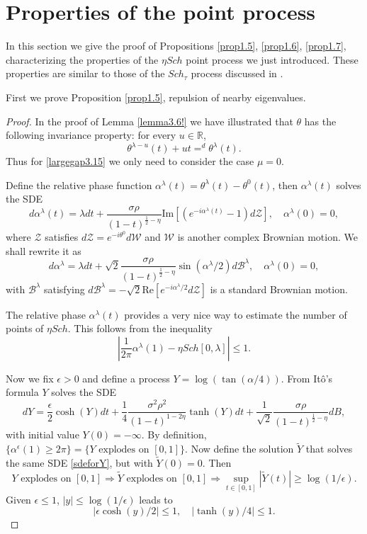 \documentclass[12pt, reqno]{amsart}
\theoremstyle{definition}
\theoremstyle{remark}
\numberwithin{equation}{section}
\begin{document}
\section{Properties of the point process}\label{section6}
In this section we give the proof of Propositions \ref{prop1.5}, \ref{prop1.6}, \ref{prop1.7}, characterizing the properties of the $\eta Sch$ point process we just introduced. These properties are similar to those of the $Sch_\tau$ process discussed in \cite{kritchevski2011scaling}.

First we prove Proposition \ref{prop1.5}, repulsion of nearby eigenvalues.


\begin{proof}
In the proof of Lemma \ref{lemma3.6!} we have illustrated that $\theta$ has the following invariance property: for every $u\in\mathbb{R}$, 
$$\theta^{\lambda-u}(t)+ut=^d \theta^\lambda(t).$$
Thus for \eqref{largegap3.15} we only need to consider the case $\mu=0$.


Define the relative phase function $\alpha^\lambda(t)=\theta^\lambda(t)-\theta^0(t)$, then $\alpha^\lambda(t)$ solves the SDE
\begin{equation}\label{6.1good}
    d\alpha^\lambda(t)=\lambda dt+\frac{\sigma\rho}{(1-t)^{\frac{1}{2}-\eta}}\text{Im}[(e^{-i\alpha^\lambda(t)}-1)d\mathcal{Z}],\quad \alpha^\lambda(0)=0,
\end{equation}
where $\mathcal{Z}$ satisfies $d\mathcal{Z}=e^{-i\theta^0}d\mathcal{W}$ and $\mathcal{W}$ is another complex Brownian motion.
We shall rewrite it as
\begin{equation}\label{eq29}
    d\alpha^\lambda=\lambda dt+\sqrt{2}\frac{\sigma\rho}{(1-t)^{\frac{1}{2}-\eta}}\sin(\alpha^\lambda/2)d\mathcal{B}^\lambda,\quad \alpha^\lambda(0)=0,
\end{equation}
with $\mathcal{B}^\lambda$ satisfying $d\mathcal{B}^\lambda=-\sqrt{2}\text{Re}[e^{-i\alpha^\lambda/2}d\mathcal{Z}]$ is a standard Brownian motion.

The relative phase $\alpha^\lambda(t)$ provides a very nice way to estimate the number of points of $\eta Sch.$ This follows from the inequality
\begin{equation}
    \left|\frac{1}{2\pi}\alpha^\lambda(1)-\eta Sch[0,\lambda]\right|\leq 1.
\end{equation}

Now we fix $\epsilon>0$ and define a process $Y=\log(\tan(\alpha/4))$. From Itô's formula $Y$ solves the SDE
\begin{equation}\label{sdeforY}
    dY=\frac{\epsilon}{2}\cosh(Y)dt+\frac{1}{4}\frac{\sigma^2\rho^2}{(1-t)^{1-2\eta}}\tanh(Y)dt+\frac{1}{\sqrt{2}}\frac{\sigma\rho}{(1-t)^{\frac{1}{2}-\eta
    }}dB,
\end{equation}
with initial value $Y(0)=-\infty.$  By definition, $\{\alpha^\epsilon(1)\geq 2\pi\}=\{Y\text{ explodes on }[0,1]\}$. Now define the solution $\tilde{Y}$ that solves the same SDE \eqref{sdeforY}, but with $\tilde{Y}(0)=0.$ Then 
$$Y\text{ explodes on }[0,1]\Rightarrow \tilde{Y} \text{ explodes on }[0,1]\Rightarrow \sup_{t\in[0,1]}|\tilde{Y}(t)|\geq \log (1/\epsilon).$$
Given $\epsilon\leq 1$, $|y|\leq\log(1/\epsilon)$ leads to
$$|\epsilon\cosh(y)/2|\leq 1,\quad |\tanh(y)/4|\leq 1.$$


\end{proof}
\end{document}
